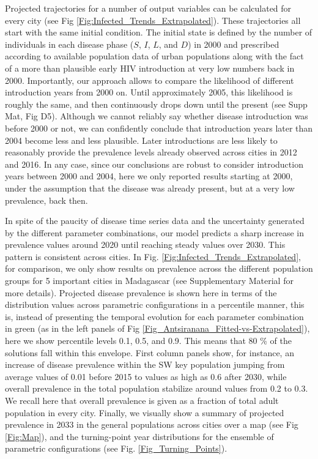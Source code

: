 \documentclass[preprint,12pt]{elsarticle}
\begin{document}
Projected trajectories for a number of output variables can be calculated for every city (see Fig \ref{Fig:Infected_Trends_Extrapolated}). These trajectories all start with the same initial condition. The initial state is defined by the number of individuals in each disease phase ($S$, $I$, $L$, and $D$) in 2000 and prescribed according to available population data of urban populations along with the fact of a more than plausible early HIV introduction at very low numbers back in 2000. Importantly, our approach allows to compare the likelihood of different introduction years from 2000 on. Until approximately 2005, this likelihood is roughly the same, and then continuously drops down until the present (see Supp Mat, Fig D5). Although we cannot reliably say whether disease introduction was before 2000 or not, we can confidently conclude that introduction years later than 2004 become less and less plausible. Later introductions are less likely to reasonably provide the prevalence levels already observed across cities in 2012 and 2016. In any case, since our conclusions are robust to consider introduction years between 2000 and 2004, here we only reported results starting at 2000, under the assumption that the disease was already present, but at a very low prevalence, back then. 
\smallskip

In spite of the paucity of disease time series data and the uncertainty generated by the different parameter combinations, our model predicts a sharp increase in prevalence values around 2020 until reaching steady values over 2030. This pattern is consistent across cities. In Fig. \ref{Fig:Infected_Trends_Extrapolated}, for comparison, we only show results on prevalence across the different population groups for 5 important cities in Madagascar (see Supplementary Material for more details). Projected disease prevalence is shown here in terms of the distribution values across parametric configurations in a percentile manner, this is, instead of presenting the temporal evolution for each parameter combination in green (as in the left panels of Fig \ref{Fig_Antsiranana_Fitted-vs-Extrapolated}), here we show percentile levels 0.1, 0.5, and 0.9. This means that 80 \% of the solutions fall within this envelope. First column panels show, for instance, an increase of disease prevalence within the SW key population jumping from average values of 0.01 before 2015 to values as high as 0.6 after 2030, while overall prevalence in the total population stabilize around values from 0.2 to 0.3. We recall here that overall prevalence is given as a fraction of total adult population in every city. Finally, we visually show a summary of projected prevalence in 2033 in the general populations across cities over a map (see Fig \ref{Fig:Map}), and the turning-point year distributions for the ensemble of parametric configurations (see Fig. \ref{Fig_Turning_Points}).
\smallskip
\end{document}
